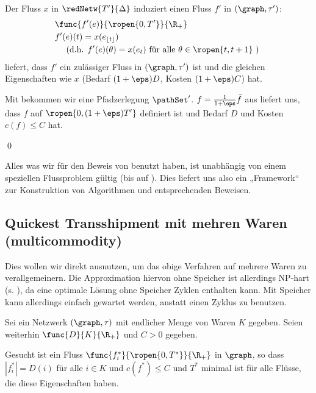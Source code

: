 \begin{standaloneProof}
    Der Fluss $x$ in $\redNetw{T'}{\Delta}$ induziert einen Fluss $f'$ in
    $(\graph, \tau')$:
    \begin{align*}
        & \func{f'(e)}{\ropen{0,T'}}{\R_+} \\
        & f'(e)(t) = x(e_{\lfloor t \rfloor}) \\
        & \quad \text{ (d.h. } f'(e)(\theta) = x(e_t)
            \text{ für alle } \theta \in \ropen{t, t+1} \text{ ) }
    \end{align*}
     liefert, dass $f'$ ein zulässiger Fluss in
    $(\graph, \tau')$ ist und die gleichen Eigenschaften wie $x$
    (Bedarf $(1+\eps)D$, Kosten $(1+\eps)C$) hat.
    
    Mit  bekommen wir eine Pfadzerlegung $\pathSet'$.
    $f = \frac{1}{1+\eps} \bar{f}$ aus  liefert uns, dass
    $f$ auf $\ropen{0, (1 + \eps)T'}$ definiert ist und Bedarf $D$ und Kosten
    $c(f) \leq C$ hat.
    \begin{flushright}\qed \end{flushright}
\end{standaloneProof}

\begin{remark}
    Alles was wir für den Beweis von  benutzt haben, ist
    unabhängig von einem speziellen Flussproblem gültig
    (bis auf ). Dies liefert uns also ein „Framework“
    zur Konstruktion von Algorithmen und entsprechenden Beweisen.
\end{remark}

\subsection*{Quickest Transshipment mit mehren Waren (multicommodity)}
Dies wollen wir direkt ausnutzen, um das obige Verfahren auf mehrere
Waren zu verallgemeinern. Die Approximation hiervon ohne Speicher ist allerdings
NP-hart (s. \cite{fleischerSiam}), da eine optimale Lösung ohne Speicher
Zyklen enthalten kann. Mit Speicher kann allerdings einfach gewartet werden,
anstatt einen Zyklus zu benutzen.

\begin{problem}
\label{prob:qtp_multi}
    Sei ein Netzwerk $(\graph, \tau)$ mit endlicher Menge von Waren $K$ gegeben.
    Seien weiterhin $\func{D}{K}{\R_+}$ und $C > 0$ gegeben.

    Gesucht ist ein Fluss $\func{f_i^*}{\ropen{0,T^*}}{\R_+}$ in $\graph$,
    so dass $|f_i^*| = D(i)$ für alle $i \in K$ und
    $c(f^*) \leq C$ und $T^*$ minimal ist für alle Flüsse,
    die diese Eigenschaften haben.
\end{problem}

